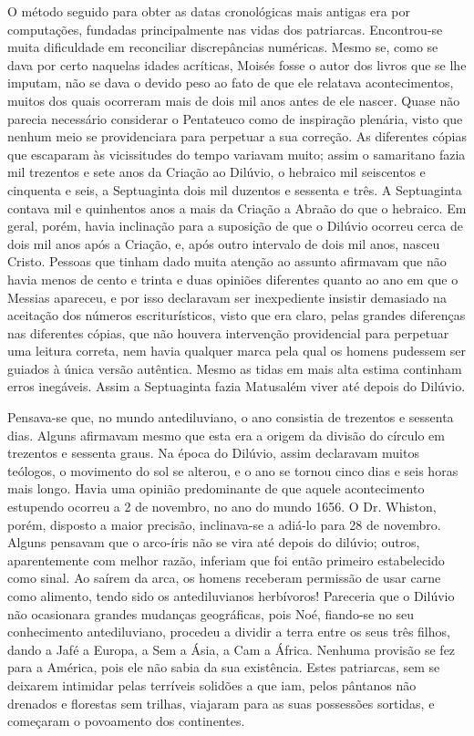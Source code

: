 \documentclass[11pt,a5paper,twoside,openany]{book}
\begin{document}
O método seguido para obter as datas cronológicas mais antigas era por computações, fundadas principalmente nas vidas dos patriarcas. Encontrou-se muita dificuldade em reconciliar discrepâncias numéricas. Mesmo se, como se dava por certo naquelas idades acríticas, Moisés fosse o autor dos livros que se lhe imputam, não se dava o devido peso ao fato de que ele relatava acontecimentos, muitos dos quais ocorreram mais de dois mil anos antes de ele nascer. Quase não parecia necessário considerar o Pentateuco como de inspiração plenária, visto que nenhum meio se providenciara para perpetuar a sua correção. As diferentes cópias que escaparam às vicissitudes do tempo variavam muito; assim o samaritano fazia mil trezentos e sete anos da Criação ao Dilúvio, o hebraico mil seiscentos e cinquenta e seis, a Septuaginta dois mil duzentos e sessenta e três. A Septuaginta contava mil e quinhentos anos a mais da Criação a Abraão do que o hebraico. Em geral, porém, havia inclinação para a suposição de que o Dilúvio ocorreu cerca de dois mil anos após a Criação, e, após outro intervalo de dois mil anos, nasceu Cristo. Pessoas que tinham dado muita atenção ao assunto afirmavam que não havia menos de cento e trinta e duas opiniões diferentes quanto ao ano em que o Messias apareceu, e por isso declaravam ser inexpediente insistir demasiado na aceitação dos números escriturísticos, visto que era claro, pelas grandes diferenças nas diferentes cópias, que não houvera intervenção providencial para perpetuar uma leitura correta, nem havia qualquer marca pela qual os homens pudessem ser guiados à única versão autêntica. Mesmo as tidas em mais alta estima continham erros inegáveis. Assim a Septuaginta fazia Matusalém viver até depois do Dilúvio.

Pensava-se que, no mundo antediluviano, o ano consistia de trezentos e sessenta dias. Alguns afirmavam mesmo que esta era a origem da divisão do círculo em trezentos e sessenta graus. Na época do Dilúvio, assim declaravam muitos teólogos, o movimento do sol se alterou, e o ano se tornou cinco dias e seis horas mais longo. Havia uma opinião predominante de que aquele acontecimento estupendo ocorreu a 2 de novembro, no ano do mundo 1656. O Dr. Whiston, porém, disposto a maior precisão, inclinava-se a adiá-lo para 28 de novembro. Alguns pensavam que o arco-íris não se vira até depois do dilúvio; outros, aparentemente com melhor razão, inferiam que foi então primeiro estabelecido como sinal. Ao saírem da arca, os homens receberam permissão de usar carne como alimento, tendo sido os antediluvianos herbívoros! Pareceria que o Dilúvio não ocasionara grandes mudanças geográficas, pois Noé, fiando-se no seu conhecimento antediluviano, procedeu a dividir a terra entre os seus três filhos, dando a Jafé a Europa, a Sem a Ásia, a Cam a África. Nenhuma provisão se fez para a América, pois ele não sabia da sua existência. Estes patriarcas, sem se deixarem intimidar pelas terríveis solidões a que iam, pelos pântanos não drenados e florestas sem trilhas, viajaram para as suas possessões sortidas, e começaram o povoamento dos continentes.
\end{document}
